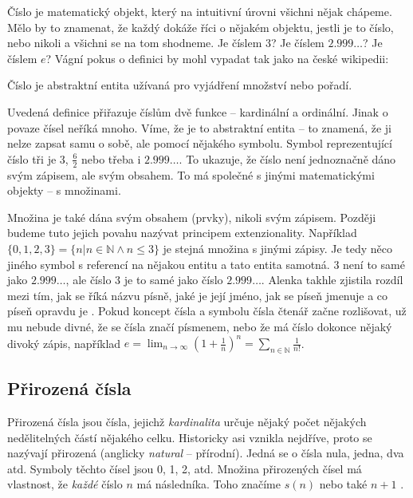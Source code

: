 Číslo je matematický objekt, který na intuitivní úrovni všichni nějak chápeme. Mělo by to znamenat, že každý dokáže říci o nějakém objektu, jestli je to číslo, nebo nikoli a všichni se na tom shodneme. Je číslem $3$? Je číslem $2.999\ldots$? Je číslem $e$? Vágní pokus o definici by mohl vypadat tak jako na české wikipedii:

\begin{definition}
Číslo je abstraktní entita užívaná pro vyjádření množství nebo pořadí.
\end{definition}

Uvedená definice přiřazuje číslům dvě funkce -- kardinální a ordinální. Jinak o povaze čísel neříká mnoho. Víme, že je to abstraktní entita -- to znamená, že ji nelze zapsat samu o sobě, ale pomocí nějakého symbolu. Symbol reprezentující číslo tři je $3$, $\frac{6}{2}$ nebo třeba i $2.999\ldots$. To ukazuje, že číslo není jednoznačně dáno svým zápisem, ale svým obsahem. To má společné s jinými matematickými objekty -- s množinami.

Množina je také dána svým obsahem (prvky), nikoli svým zápisem. Později budeme tuto jejich povahu nazývat principem extenzionality. Například $\{0, 1, 2, 3 \} = \{ n | n \in \mathbb{N} \land n \leq 3 \}$ je stejná množina s jinými zápisy. Je tedy něco jiného symbol s referencí na nějakou entitu a tato entita samotná. $3$ není to samé jako $2.999\ldots$, ale číslo $3$ je to samé jako číslo $2.999\ldots$. Alenka takhle zjistila rozdíl mezi tím, jak se říká názvu písně, jaké je její jméno, jak se píseň jmenuje a co píseň opravdu je \cite{TtLG}. Pokud koncept čísla a symbolu čísla čtenář začne rozlišovat, už mu nebude divné, že se čísla značí písmenem, nebo že má číslo dokonce nějaký divoký zápis, například $e = \lim_{n \to \infty} \left(1 +\frac{1}{n} \right)^n = \sum_{n\in\mathbb{N}}\frac{1}{n!}$.

\subsection{Přirozená čísla}
Přirozená čísla jsou čísla, jejichž \textit{kardinalita} určuje nějaký počet nějakých nedělitelných částí nějakého celku. Historicky asi vznikla nejdříve, proto se nazývají přirozená (anglicky \textit{natural} -- přírodní). Jedná se o čísla nula, jedna, dva atd. Symboly těchto čísel jsou 0, 1, 2, atd. Množina přirozených čísel má vlastnost, že \textit{každé} číslo $n$ má následníka. Toho značíme $s(n)$ nebo také $n+1$ \cite{LambdaCalcul}.

